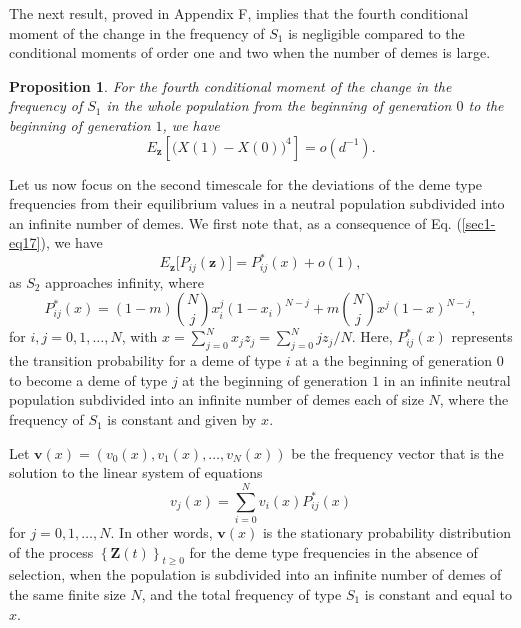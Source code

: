 \documentclass[11pt]{article}
\newtheorem{Proposition}{Proposition}
\begin{document}
The next result, proved in Appendix F, implies that the fourth conditional moment of the change in the frequency of $S_1$ is negligible compared to the conditional moments of order one and two when the number of demes is large.

\begin{Proposition}\label{Proposition3}
For the fourth conditional moment of the change in the frequency of $S_1$ in the whole population from the beginning of generation $0$ to the beginning of generation $1$, we have
\begin{equation}\label{sec2-eq30}
E_{\mathbf{z}}\left[\Big(X(1)-X(0)\Big)^4\right]=o(d^{-1}).
\end{equation}
\end{Proposition}


Let us now focus on the second timescale for the deviations of the deme type frequencies from their equilibrium values in a neutral population subdivided into an infinite number of demes.
We first note that, as a consequence of Eq. (\ref{sec1-eq17}), we have
\begin{equation}\label{sec2-eq37}
E_{\mathbf{z}}\Big[P_{ij}(\mathbf{z})\Big]=P^{*}_{ij}(x)+o(1),
\end{equation}
as $S_2$ approaches infinity, where
\begin{equation}\label{sec2-eq38}
P^{*}_{ij}(x)=(1-m)\binom{N}{j}x_i^j\left(1-x_i\right)^{N-j}+m\binom{N}{j}x^j\left(1-x\right)^{N-j},
\end{equation}
for $i, j =0, 1, \ldots,N$, with $x=\sum_{j=0}^N x_jz_j= \sum_{j=0}^N jz_j/N$. Here,
$P^{*}_{ij}(x)$ represents the transition probability for a deme of type $i$ at a the beginning of generation $0$ to become a deme of type $j$ at the beginning of generation $1$ in an infinite neutral population subdivided into an infinite number of demes each of size $N$, where the frequency of $S_1$ is constant and given by $x$.

Let  $\mathbf{v}(x)=(v_0(x), v_1(x), \ldots,v_N(x))$ be the frequency vector that is the solution to the linear system of equations
\begin{equation}\label{sec2-eq39}
v_j(x)=\sum_{i=0}^{N}v_i(x)P_{ij}^{*}(x)
\end{equation}
for $j=0,1,\ldots,N$.
In other words, $\mathbf{v}(x)$ is the stationary probability distribution of the process $\left\{\mathbf{Z}(t)\right\}_{t\geq 0}$ for the deme type frequencies in the absence of selection, when the population is subdivided into an infinite number of demes of the same finite size $N$, and the total frequency of type $S_1$ is constant and equal to $x$.
\end{document}
